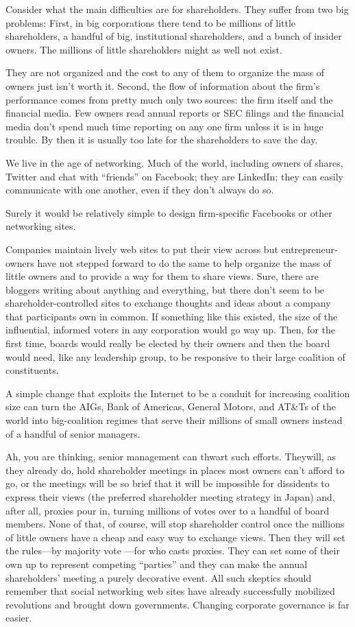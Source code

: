 \documentclass[10pt]{article}
\begin{document}
{\large Consider what the main difficulties are for shareholders. They suffer
from two big problems: First, in big corporations there tend to be millions of
little shareholders, a handful of big, institutional shareholders, and a bunch of
insider owners. The millions of little shareholders might as well not exist.}

{\large They are not organized and the cost to any of them to organize the mass
of owners just isn't worth it. Second, the flow of information about the firm's
performance comes from pretty much only two sources: the firm itself and the
financial media. Few owners read annual reports or SEC filings and the financial
media don't spend much time reporting on any one firm unless it is in huge
trouble. By then it is usually too late for the shareholders to save the day.}

{\large We live in the age of networking. Much of the world, including owners of
shares, Twitter and chat with ``friends'' on Facebook; they are LinkedIn; they
can easily communicate with one another, even if they don't always do so.}

{\large Surely it would be relatively simple to design firm-specific Facebooks
or other networking sites.}

{\large Companies maintain lively web sites to put their view across but
entrepreneur-owners have not stepped forward to do the same to help organize the
mass of little owners and to provide a way for them to share views. Sure, there
are bloggers writing about anything and everything, but there don't seem to be
shareholder-controlled sites to exchange thoughts and ideas about a company that
participants own in common. If something like this existed, the size of the
influential, informed voters in any corporation would go way up. Then, for the
first time, boards would really be elected by their owners and then the board
would need, like any leadership group, to be responsive to their large coalition
of constituents.}

{\large A simple change that exploits the Internet to be a conduit for
increasing coalition size can turn the AIGs, Bank of Americas, General Motors,
and AT\&Ts of the world into big-coalition regimes that serve their millions of
small owners instead of a handful of senior managers.}

{\large Ah, you are thinking, senior management can thwart such efforts.
Theywill, as they already do, hold shareholder meetings in places most owners
can't afford to go, or the meetings will be so brief that it will be impossible
for dissidents to express their views (the preferred shareholder meeting strategy
in Japan) and, after all, proxies pour in, turning millions of votes over to a
handful of board members. None of that, of course, will stop shareholder control
once the millions of little owners have a cheap and easy way to exchange views.
Then they will set the rules---by majority vote ---for who casts proxies. They
can set some of their own up to represent competing ``parties'' and they can make
the annual shareholders' meeting a purely decorative event. All such skeptics
should remember that social networking web sites have already successfully
mobilized revolutions and brought down governments. Changing corporate governance
is far easier.}
\end{document}
